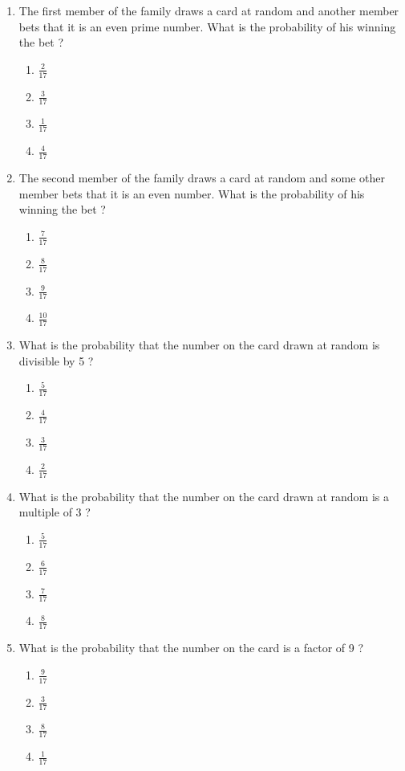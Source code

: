 \documentclass{article}
\begin{document}
\begin{enumerate}
		\begin{enumerate}
			\item The first member of the family draws a card at random and another member bets that it is an even prime number. What is the probability of his winning the bet ? 
			\begin{enumerate}
				\item $\frac{2}{17}$
				\item $\frac{3}{17}$
				\item $\frac{1}{17}$ 
				\item $\frac{4}{17}$ 
			\end{enumerate}
			\item The second member of the family draws a card at random and some other member bets that it is an even number. What is the probability of his winning the bet ? 
			\begin{enumerate}
				\item $\frac{7}{17}$
				\item $\frac{8}{17}$
				\item $\frac{9}{17}$ 
				\item $\frac{10}{17}$ 
			\end{enumerate}
			\item What is the probability that the number on the card drawn at random is divisible by 5 ? 
			\begin{enumerate}
				\item $\frac{5}{17}$
				\item $\frac{4}{17}$
				\item $\frac{3}{17}$ 
				\item $\frac{2}{17}$ 
			\end{enumerate}
			\item What is the probability that the number on the card drawn at random is a multiple of 3 ? 
			\begin{enumerate}
				\item $\frac{5}{17}$
				\item $\frac{6}{17}$
				\item $\frac{7}{17}$ 
				\item $\frac{8}{17}$ 
			\end{enumerate}
			\item What is the probability that the number on the card is a factor of 9 ?
			\begin{enumerate}
				\item $\frac{9}{17}$
				\item $\frac{3}{17}$
				\item $\frac{8}{17}$ 
				\item $\frac{1}{17}$ 
			\end{enumerate}
		\end{enumerate}
		

\end{enumerate}
\end{document}
